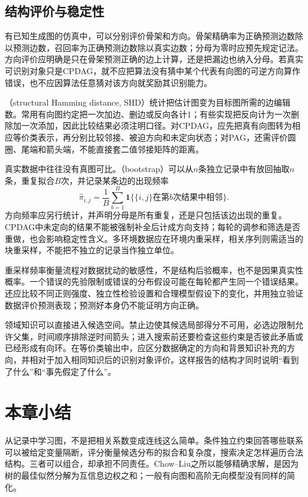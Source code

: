 \subsection{结构评价与稳定性}
\label{sec:pgm-structure-learning-evaluation}

有已知生成图的仿真中，可以分别评价骨架和方向。骨架精确率为正确预测边数除以预测边数，召回率为正确预测边数除以真实边数；分母为零时应预先规定记法。方向评价应明确是只在骨架预测正确的边上计算，还是把漏边也纳入分母。若真实可识别对象只是CPDAG，就不应把算法没有猜中某个代表有向图的可逆方向算作错误，也不应因算法任意猜对该方向就奖励其识别能力。

（structural Hamming distance, SHD）统计把估计图变为目标图所需的边编辑数。常用有向图约定把一次加边、删边或反向各计1；有些实现把反向计为一次删除加一次添加，因此比较结果必须注明口径。对CPDAG，应先把真有向图转为相应等价类表示，再分别比较邻接、被迫方向和未定向状态；对PAG，还需评价圆圈、尾端和箭头端，不能直接套二值邻接矩阵的距离。

真实数据中往往没有真图可比。（bootstrap）可以从$n$条独立记录中有放回抽取$n$条，重复拟合$B$次，并记录某条边的出现频率
\[
  \widehat\pi_{i,j}
  =\frac1B\sum_{b=1}^{B}
       \mathbf{1}\{\{i,j\}\text{在第}b\text{次结果中相邻}\}.
\]
方向频率应另行统计，并声明分母是所有重复，还是只包括该边出现的重复。CPDAG中未定向的结果不能被强制补全后计成方向支持；每轮的调参和筛选是否重做，也会影响稳定性含义。多环境数据应在环境内重采样，相关序列则需适当的块重采样，不能把不独立的记录当作独立单位。

重采样频率衡量流程对数据扰动的敏感性，不是结构后验概率，也不是因果真实性概率。一个错误的先验限制或错误的分布假设可能在每轮都产生同一个错误结果。还应比较不同正则强度、独立性检验设置和合理模型假设下的变化，并用独立验证数据评价预测表现；预测好本身仍不能证明方向正确。

领域知识可以直接进入候选空间。禁止边使其候选局部得分不可用，必选边限制允许父集，时间顺序排除逆时间箭头；进入搜索前还要检查这些约束是否彼此矛盾或已经形成有向环。在等价类输出中，应区分数据确定的方向和背景知识补充的方向，并相对于加入相同知识后的识别对象评价。这样报告的结构才同时说明“看到了什么”和“事先假定了什么”。

\section{本章小结}
\label{sec:pgm-structure-learning-summary}

从记录中学习图，不是把相关系数变成连线这么简单。条件独立约束回答哪些联系可以被给定变量隔断，评分衡量候选分布的拟合和复杂度，搜索决定怎样遍历合法结构。三者可以组合，却承担不同责任。Chow--Liu之所以能够精确求解，是因为树的最佳似然分解为互信息边权之和；一般有向图和高阶无向模型没有同样的简化。

